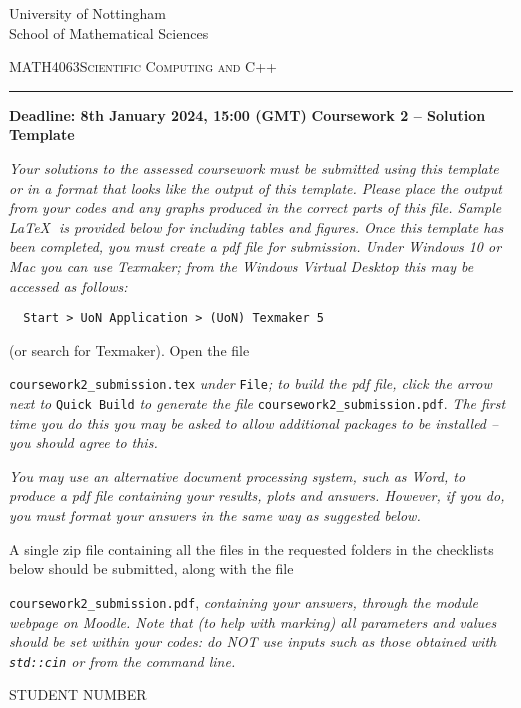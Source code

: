 \documentclass[a4,10pt,fleqn]{article}  %
\begin{document}
\thispagestyle{empty}
\begin{center}
University of Nottingham\\
School of Mathematical Sciences
\end{center}
\large\textsc {MATH4063}\hfill\large\textsc {Scientific Computing and C++}%
\vspace*{2ex}
\hrule
\vskip0.25cm
\textbf{Deadline: 8th January 2024, 15:00 (GMT)}
\hfill \textbf{Coursework 2 -- Solution Template}\\

\noindent
{\em Your solutions to the assessed coursework must be submitted using this template
or in a format that looks like the output of this template. Please place the output from
your codes and any graphs produced in the correct parts of this file. Sample \LaTeX
$\;$is provided below for including tables and figures. Once this template has been completed,
you must create a pdf file for submission. Under Windows 10 or Mac you can use Texmaker;
from the Windows Virtual Desktop this may be accessed as follows:
\begin{verbatim}
  Start > UoN Application > (UoN) Texmaker 5
\end{verbatim}
(or search for Texmaker). Open the file} \texttt{coursework2\_submission.tex} {\em under}
\texttt{File}{\em; to build the pdf file, click the arrow next to} \texttt{Quick Build} {\em to
generate the file} \texttt{coursework2\_submission.pdf}. {\em The first time you do this you may
be asked to allow additional packages to be installed -- you should agree to this.}

\vspace{2mm}
{\em You may use an alternative document processing system, such as Word, to produce a pdf
file containing your results, plots and answers. However, if you do, you must format your
answers in the same way as suggested below.

\vspace{2mm}
A single zip file containing all the files in the requested folders in the checklists
below should be submitted, along with the file} \texttt{coursework2\_submission.pdf},
{\em containing your answers, through the module webpage on Moodle. Note that (to help with marking) all
parameters and values should be set within your codes: do NOT use inputs such as
those obtained with {\tt std::cin} or from the command line.
}

\vspace{25mm}
\centerline{\LARGE STUDENT NUMBER}
\end{document}

